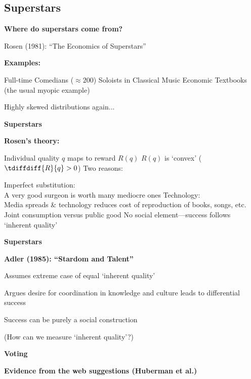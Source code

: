 \subsection{Superstars}

  \textbf{Where do superstars come from?}

  
    Rosen (1981): \alert{``The Economics of Superstars''}\cite{rosen1981a}
  

  \textbf{Examples:}
  
   Full-time Comedians ($\approx 200$)
   Soloists in Classical Music
   Economic Textbooks (the usual myopic example)
  
  

  
    
     {Highly skewed distributions again...}
    
  
  

  \textbf{Superstars}

  \textbf{Rosen's theory:}
    
     Individual quality $q$ maps to reward $R(q)$
     $R(q)$ is `convex' ($\tdiffdiff{R}{q} > 0$)
     Two reasons:
      
       \alert{Imperfect substitution:}\\
        {A very good surgeon is worth many mediocre ones}
       \alert{Technology:}\\
        {Media spreads \& technology reduces cost of reproduction
          of books, songs, etc.}\\
      
    {Joint consumption versus public good}
    {No social element---success follows `inherent quality'}
    
    
  
  

  \textbf{Superstars}
 
  \textbf{Adler (1985): \alert{``Stardom and Talent''}\cite{adler1985a}}
    
     
      Assumes extreme case of equal `inherent quality'
     
      Argues desire for coordination in knowledge and culture
      leads to differential success
     
      Success can be purely a social construction
     
      (How can we measure `inherent quality'?)
    
  
  

  \textbf{Voting}
 
  \textbf{Evidence from the web suggestions (Huberman et al.)}
    
